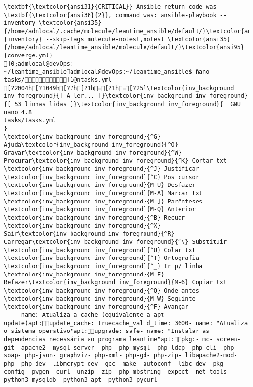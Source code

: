 \documentclass{scrartcl}
\begin{document}
\begin{Verbatim}
\textbf{\textcolor{ansi31}{CRITICAL}} Ansible return code was \textbf{\textcolor{ansi36}{2}}, command was: ansible-playbook --inventory \textcolor{ansi35}{/home/admlocal/.cache/molecule/leantime_ansible/default/}\textcolor{ansi95}{inventory} --skip-tags molecule-notest,notest \textcolor{ansi35}{/home/admlocal/leantime_ansible/molecule/default/}\textcolor{ansi95}{converge.yml}
]0;admlocal@devOps: ~/leantime_ansibleadmlocal@devOps:~/leantime_ansible$ ñano tasks/[1@ntasks.yml 
[?2004h[?1049h[?7h[?1h=[?1h=[?25l\textcolor{inv_background inv_foreground}{[ A ler... ]}\textcolor{inv_background inv_foreground}{[ 53 linhas lidas ]}\textcolor{inv_background inv_foreground}{  GNU nano 4.8                                                                          tasks/tasks.yml                                                                                      }
\textcolor{inv_background inv_foreground}{^G} Ajuda\textcolor{inv_background inv_foreground}{^O} Gravar\textcolor{inv_background inv_foreground}{^W} Procurar\textcolor{inv_background inv_foreground}{^K} Cortar txt    \textcolor{inv_background inv_foreground}{^J} Justificar    \textcolor{inv_background inv_foreground}{^C} Pos cursor    \textcolor{inv_background inv_foreground}{M-U} Desfazer     \textcolor{inv_background inv_foreground}{M-A} Marcar txt   \textcolor{inv_background inv_foreground}{M-]} Parênteses   \textcolor{inv_background inv_foreground}{M-Q} Anterior     \textcolor{inv_background inv_foreground}{^B} Recuar
\textcolor{inv_background inv_foreground}{^X} Sair\textcolor{inv_background inv_foreground}{^R} Carregar\textcolor{inv_background inv_foreground}{^\} Substituir    \textcolor{inv_background inv_foreground}{^U} Colar txt     \textcolor{inv_background inv_foreground}{^T} Ortografia    \textcolor{inv_background inv_foreground}{^_} Ir p/ linha   \textcolor{inv_background inv_foreground}{M-E} Refazer\textcolor{inv_background inv_foreground}{M-6} Copiar txt   \textcolor{inv_background inv_foreground}{^Q} Onde antes    \textcolor{inv_background inv_foreground}{M-W} Seguinte     \textcolor{inv_background inv_foreground}{^F} Avançar
---- name: Atualiza a cache (equivalente a apt update)apt:update_cache: truecache_valid_time: 3600- name: "Atualiza o sistema operativo"apt:upgrade: safe- name: "Instalar as dependencias necessária ao programa leantime"apt:pkg:- mc- screen- git- apache2- mysql-server- php- php-mysql- php-ldap- php-cli- php-soap- php-json- graphviz- php-xml- php-gd- php-zip- libapache2-mod-php- php-dev- libmcrypt-dev- gcc- make- autoconf- libc-dev- pkg-config- pwgen- curl- unzip- zip- php-mbstring- expect- net-tools- python3-mysqldb- python3-apt- python3-pycurl

\end{Verbatim}
\end{document}
